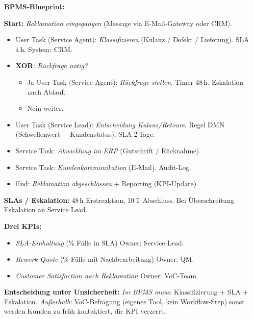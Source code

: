 \documentclass[11pt,a4paper,oneside]{article}
\begin{document}
\begin{loesungbox}
\textbf{BPMS-Blueprint:}

\smallskip
\textbf{Start:} \emph{Reklamation eingegangen} (Message via E-Mail-Gateway oder CRM).
\begin{itemize}
  \item User Task (Service Agent): \emph{Klassifizieren} (Kulanz / Defekt / Lieferung). SLA 4\,h. System: CRM.
  \item \textbf{XOR}: \emph{R\"uckfrage n\"otig?}
  \begin{itemize}
    \item Ja \textrightarrow{} User Task (Service Agent): \emph{R\"uckfrage stellen}. Timer 48\,h. Eskalation nach Ablauf.
    \item Nein \textrightarrow{} weiter.
  \end{itemize}
  \item User Task (Service Lead): \emph{Entscheidung Kulanz/Retoure}. Regel DMN (Schwellenwert + Kundenstatus). SLA 2\,Tage.
  \item Service Task: \emph{Abwicklung im ERP} (Gutschrift / R\"ucknahme).
  \item Service Task: \emph{Kundenkommunikation} (E-Mail). Audit-Log.
  \item End: \emph{Reklamation abgeschlossen} + Reporting (KPI-Update).
\end{itemize}

\smallskip
\textbf{SLAs / Eskalation:} 48\,h Erstreaktion, 10\,T Abschluss. Bei \"Uberschreitung Eskalation an Service Lead.

\smallskip
\textbf{Drei KPIs:}
\begin{itemize}
  \item \emph{SLA-Einhaltung} (\% F\"alle in SLA) \textendash{} Owner: Service Lead.
  \item \emph{Rework-Quote} (\% F\"alle mit Nachbearbeitung) \textendash{} Owner: QM.
  \item \emph{Customer Satisfaction nach Reklamation} \textendash{} Owner: VoC-Team.
\end{itemize}

\smallskip
\textbf{Entscheidung unter Unsicherheit:} \emph{Im BPMS muss:} Klassifizierung + SLA + Eskalation. \emph{Au{\ss}erhalb:} VoC-Befragung (eigenes Tool, kein Workflow-Step) \textendash{} sonst werden Kunden zu fr\"uh kontaktiert, die KPI verzerrt.
\end{loesungbox}

\clearpage
\end{document}
